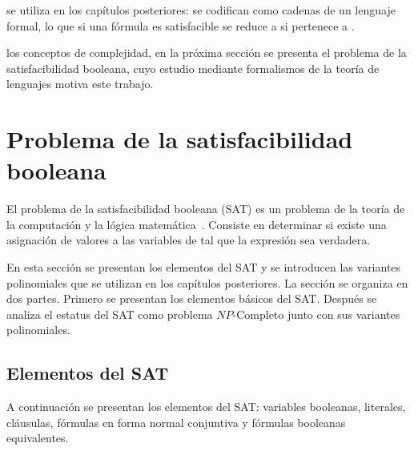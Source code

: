 \documentclass{report}
\theoremstyle{definition}
\theoremstyle{plain}
\theoremstyle{remark}
\begin{document}
 se utiliza en los capítulos posteriores:  se codifican como cadenas de un lenguaje formal,  lo que  si una fórmula es satisfacible se reduce a  si  pertenece a .

 los conceptos de complejidad, en la próxima sección se presenta el problema de la satisfacibilidad booleana, cuyo estudio mediante formalismos de la teoría de lenguajes motiva este trabajo.

\section{Problema de la satisfacibilidad booleana}
\label{sec:sat}

El problema de la satisfacibilidad booleana (SAT) es un problema de la teoría de la computación y la lógica matemática~\cite{hopcroft2006introduction}. Consiste en determinar si existe una asignación de valores a las variables de  tal que la expresión sea verdadera.

En esta sección se presentan los elementos del SAT y se introducen las variantes polinomiales que se utilizan en los capítulos posteriores. La sección se organiza en dos partes. Primero se presentan los elementos básicos del SAT. Después se analiza el estatus del SAT como problema $NP$-Completo junto con sus variantes polinomiales.

\subsection{Elementos del SAT}

A continuación se presentan los elementos del SAT: variables booleanas, literales, cláusulas, fórmulas en forma normal conjuntiva y fórmulas booleanas equivalentes.
\end{document}
